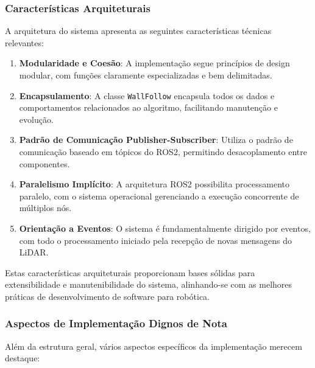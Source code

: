\subsubsection{Características Arquiteturais}

A arquitetura do sistema apresenta as seguintes características técnicas
relevantes:

\begin{enumerate}
    \item \textbf{Modularidade e Coesão}: A implementação segue princípios de design modular, com funções claramente especializadas e bem delimitadas.

    \item \textbf{Encapsulamento}: A classe \texttt{WallFollow} encapsula todos os dados e comportamentos relacionados ao algoritmo, facilitando manutenção e evolução.

    \item \textbf{Padrão de Comunicação Publisher-Subscriber}: Utiliza o padrão de comunicação baseado em tópicos do ROS2, permitindo desacoplamento entre componentes.

    \item \textbf{Paralelismo Implícito}: A arquitetura ROS2 possibilita processamento paralelo, com o sistema operacional gerenciando a execução concorrente de múltiplos nós.

    \item \textbf{Orientação a Eventos}: O sistema é fundamentalmente dirigido por eventos, com todo o processamento iniciado pela recepção de novas mensagens do LiDAR.
\end{enumerate}

Estas características arquiteturais proporcionam bases sólidas para
extensibilidade e manutenibilidade do sistema, alinhando-se com as melhores
práticas de desenvolvimento de software para robótica.

\subsubsection{Aspectos de Implementação Dignos de Nota}

Além da estrutura geral, vários aspectos específicos da implementação merecem
destaque:

